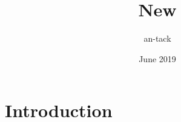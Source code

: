 \documentclass{article}
\title{New}
\author{an-tack }
\date{June 2019}
\begin{document}
\maketitle

\section{Introduction}
\end{document}
